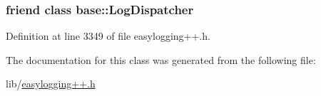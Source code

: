 \subsubsection[{base\+::\+Log\+Dispatcher}]{\setlength{\rightskip}{0pt plus 5cm}friend class {\bf base\+::\+Log\+Dispatcher}\hspace{0.3cm}{\ttfamily [friend]}}\label{classel_1_1_log_dispatch_callback_a84d22f9ad5b796e49ff5f15a8c32773d}


Definition at line 3349 of file easylogging++.\+h.



The documentation for this class was generated from the following file\+:\begin{DoxyCompactItemize}
\item 
lib/\hyperlink{easylogging_09_09_8h}{easylogging++.\+h}\end{DoxyCompactItemize}
